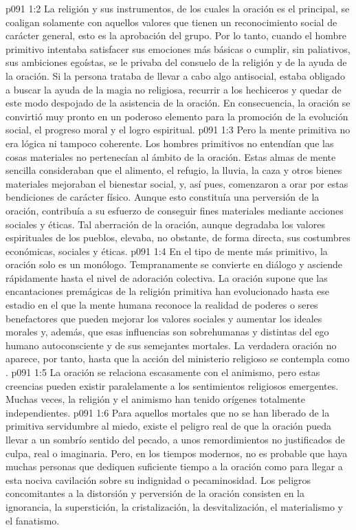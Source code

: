 \vs p091 1:2 \pc La religión y sus instrumentos, de los cuales la oración es el principal, se coaligan solamente con aquellos valores que tienen un reconocimiento social de carácter general, esto es la aprobación del grupo. Por lo tanto, cuando el hombre primitivo intentaba satisfacer sus emociones más básicas o cumplir, sin paliativos, sus ambiciones egoístas, se le privaba del consuelo de la religión y de la ayuda de la oración. Si la persona trataba de llevar a cabo algo antisocial, estaba obligado a buscar la ayuda de la magia no religiosa, recurrir a los hechiceros y quedar de este modo despojado de la asistencia de la oración. En consecuencia, la oración se convirtió muy pronto en un poderoso elemento para la promoción de la evolución social, el progreso moral y el logro espiritual.
\vs p091 1:3 Pero la mente primitiva no era lógica ni tampoco coherente. Los hombres primitivos no entendían que las cosas materiales no pertenecían al ámbito de la oración. Estas almas de mente sencilla consideraban que el alimento, el refugio, la lluvia, la caza y otros bienes materiales mejoraban el bienestar social, y, así pues, comenzaron a orar por estas bendiciones de carácter físico. Aunque esto constituía una perversión de la oración, contribuía a su esfuerzo de conseguir fines materiales mediante acciones sociales y éticas. Tal aberración de la oración, aunque degradaba los valores espirituales de los pueblos, elevaba, no obstante, de forma directa, sus costumbres económicas, sociales y éticas.
\vs p091 1:4 En el tipo de mente más primitivo, la oración solo es un monólogo. Tempranamente se convierte en diálogo y asciende rápidamente hasta el nivel de adoración colectiva. La oración supone que las encantaciones premágicas de la religión primitiva han evolucionado hasta ese estadio en el que la mente humana reconoce la realidad de poderes o seres benefactores que pueden mejorar los valores sociales y aumentar los ideales morales y, además, que esas influencias son sobrehumanas y distintas del ego humano autoconsciente y de sus semejantes mortales. La verdadera oración no aparece, por tanto, hasta que la acción del ministerio religioso se contempla como .
\vs p091 1:5 \pc La oración se relaciona escasamente con el animismo, pero estas creencias pueden existir paralelamente a los sentimientos religiosos emergentes. Muchas veces, la religión y el animismo han tenido orígenes totalmente independientes.
\vs p091 1:6 \pc Para aquellos mortales que no se han liberado de la primitiva servidumbre al miedo, existe el peligro real de que la oración pueda llevar a un sombrío sentido del pecado, a unos remordimientos no justificados de culpa, real o imaginaria. Pero, en los tiempos modernos, no es probable que haya muchas personas que dediquen suficiente tiempo a la oración como para llegar a esta nociva cavilación sobre su indignidad o pecaminosidad. Los peligros concomitantes a la distorsión y perversión de la oración consisten en la ignorancia, la superstición, la cristalización, la desvitalización, el materialismo y el fanatismo.

